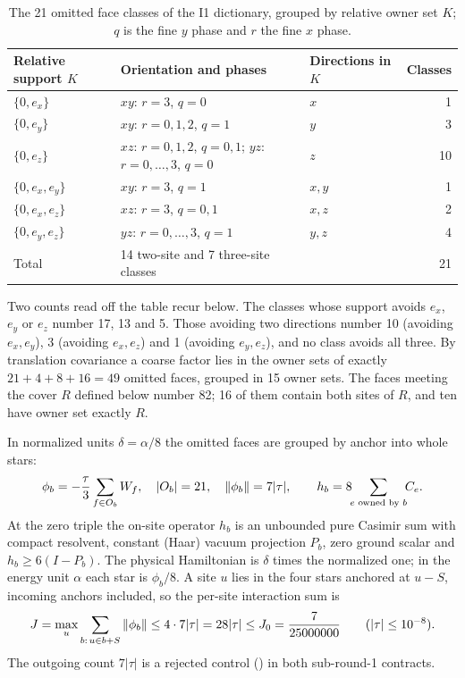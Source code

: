 \begin{table}[htbp]
\centering\small
\caption{The 21 omitted face classes of the I1 dictionary, grouped by relative
owner set $K$; $q$ is the fine $y$ phase and $r$ the fine $x$ phase.}
\label{tab:dict-classes}
\begin{tabular}{lll r}
\toprule
Relative support $K$ & Orientation and phases & Directions in $K$ & Classes\\
\midrule
$\{0,e_x\}$ & $xy$: $r=3$, $q=0$ & $x$ & 1\\
$\{0,e_y\}$ & $xy$: $r=0,1,2$, $q=1$ & $y$ & 3\\
$\{0,e_z\}$ & $xz$: $r=0,1,2$, $q=0,1$; $yz$: $r=0,\dots,3$, $q=0$ & $z$ & 10\\
$\{0,e_x,e_y\}$ & $xy$: $r=3$, $q=1$ & $x,y$ & 1\\
$\{0,e_x,e_z\}$ & $xz$: $r=3$, $q=0,1$ & $x,z$ & 2\\
$\{0,e_y,e_z\}$ & $yz$: $r=0,\dots,3$, $q=1$ & $y,z$ & 4\\
\midrule
Total & 14 two-site and 7 three-site classes & & 21\\
\bottomrule
\end{tabular}
\end{table}

Two counts read off the table recur below. The classes whose support avoids
$e_x$, $e_y$ or $e_z$ number 17, 13 and 5. Those avoiding two directions
number 10 (avoiding $e_x,e_y$), 3 (avoiding $e_x,e_z$) and 1 (avoiding
$e_y,e_z$), and no class avoids all three. By translation covariance a coarse
factor lies in the owner sets of exactly $21+4+8+16=49$ omitted faces,
grouped in 15 owner sets. The faces meeting the cover $R$ defined below number 82; 16
of them contain both sites of $R$, and ten have owner set exactly $R$.

In normalized units $\delta=\alpha/8$ the omitted faces are grouped by anchor
into whole stars:
\begin{equation}
 \phi_b=-\frac{\tau}{3}\sum_{f\in O_b}W_f,\quad |O_b|=21,\quad
 \left\lVert\phi_b\right\rVert=7|\tau|,\qquad
 h_b=8\!\!\sum_{e\text{ owned by }b}\!\!C_e .
 \label{eq:dict-star}
\end{equation}
At the zero triple the on-site operator $h_b$ is an unbounded pure Casimir sum
with compact resolvent, constant (Haar) vacuum projection $P_b$, zero ground
scalar and $h_b\ge6(I-P_b)$. The physical Hamiltonian is $\delta$ times the
normalized one; in the energy unit $\alpha$ each star is $\phi_b/8$. A site
$u$ lies in the four stars anchored at $u-S$, incoming anchors included, so
the per-site interaction sum is
\begin{equation}
 J=\max_u\sum_{b:\,u\in b+S}\left\lVert\phi_b\right\rVert\le4\cdot7|\tau|=28|\tau|\le
 J_0=\frac{7}{25000000}\qquad(|\tau|\le10^{-8}).
 \label{eq:dict-J}
\end{equation}
The outgoing count $7|\tau|$ is a rejected control () in
both sub-round-1 contracts.

